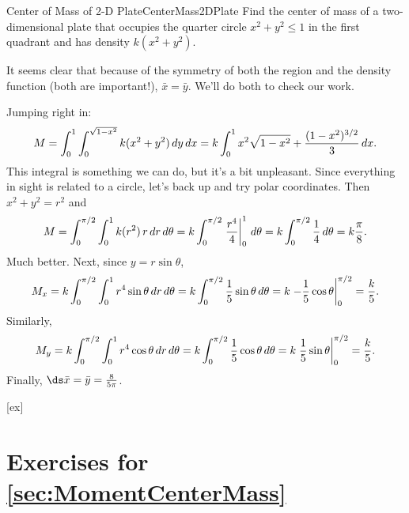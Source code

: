 \begin{example}{Center of Mass of 2-D Plate}{CenterMass2DPlate}
Find the center of mass of a two-dimensional plate 
that occupies the quarter circle $x^2+y^2\le1$ in the
first quadrant and has density
$k(x^2+y^2)$.
\end{example}
\begin{solution}
It seems clear that because of the symmetry of both the
region and the density function (both are important!), $\bar x=\bar y$.
We'll do both to check our work.

Jumping right in:
\[
M=\int_0^1 \int_0^{\sqrt{1-x^2}} k(x^2+y^2)\,dy\,dx
=k\int_0^1 x^2\sqrt{1-x^2}+{(1-x^2)^{3/2}\over3}\,dx.
\]
This integral is something we can do, but it's a bit unpleasant. Since
everything in sight is related to a circle, let's back up and try
polar coordinates. Then $x^2+y^2=r^2$ and
\[M=\int_0^{\pi/2} \int_0^{1} k(r^2)\,r\,dr\,d\theta
=k\int_0^{\pi/2}\left.{r^4\over4}\right|_0^1\,d\theta
=k\int_0^{\pi/2} {1\over4}\,d\theta
=k{\pi\over8}.
\]
Much better. Next, since $y=r\sin\theta$,
\[M_x=k\int_0^{\pi/2} \int_0^{1} r^4\sin\theta\,dr\,d\theta
=k\int_0^{\pi/2} {1\over5}\sin\theta\,d\theta
=k\left.-{1\over5}\cos\theta\right|_0^{\pi/2}={k\over5}.
\]
Similarly,
\[M_y=k\int_0^{\pi/2} \int_0^{1} r^4\cos\theta\,dr\,d\theta
=k\int_0^{\pi/2} {1\over5}\cos\theta\,d\theta
=k\left.{1\over5}\sin\theta\right|_0^{\pi/2}={k\over5}.
\]
Finally, $\ds\bar x = \bar y = {8\over5\pi}$.
\end{solution}

[ex]
\section*{Exercises for \ref{sec:MomentCenterMass}}

